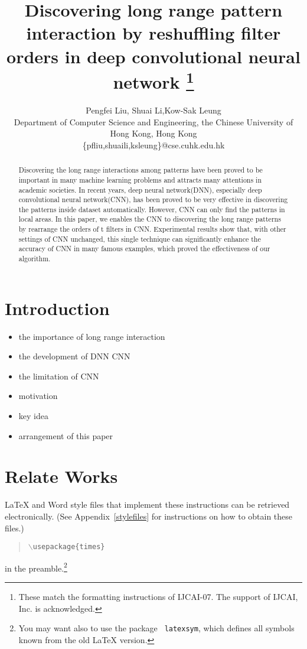 \documentclass{article}
\title{Discovering long range pattern interaction by reshuffling filter orders in deep convolutional neural network \thanks{These match the formatting instructions of IJCAI-07. The support of IJCAI, Inc. is acknowledged.}}
\author{Pengfei Liu, Shuai Li,Kow-Sak Leung\\ 
Department of Computer Science and Engineering, the Chinese University of Hong Kong, Hong Kong\\
\{pfliu,shuaili,ksleung\}@cse.cuhk.edu.hk}
\begin{document}
\maketitle

\begin{abstract}
  Discovering the long range interactions among patterns have been proved to be important in many machine learning problems and attracts many attentions in academic societies. In recent years, deep neural network(DNN), especially deep convolutional neural network(CNN), has been proved to be very effective in discovering the patterns inside dataset automatically. However, CNN can only find the patterns in local areas. In this paper, we enables the CNN to discovering the long range patterns by rearrange the orders of t filters in CNN. Experimental results show that, with other settings of CNN unchanged, this single technique can significantly enhance the accuracy of CNN in many famous examples, which proved the effectiveness of our algorithm.     
\end{abstract}

\section{Introduction}

\begin{itemize}
	\item the importance of long range interaction
	\item the development of DNN CNN
	\item the limitation of CNN
	\item motivation
	\item key idea
	\item arrangement of this paper
\end{itemize}

\section{Relate Works}

\LaTeX{} and Word style files that implement these instructions
can be retrieved electronically. (See Appendix~\ref{stylefiles} for
instructions on how to obtain these files.)



\begin{quote} 
\mbox{\tt $\backslash$usepackage\{times\}}
\end{quote}
in the preamble.\footnote{You may want also to use the package {\tt
latexsym}, which defines all symbols known from the old \LaTeX{}
version.}
\end{document}
